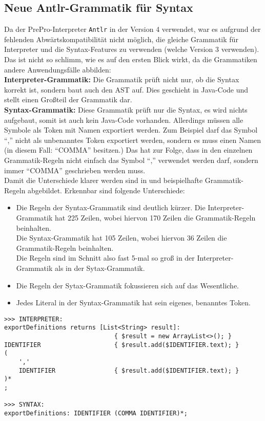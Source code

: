 \subsection{Neue Antlr-Grammatik für Syntax}
Da der PrePro-Interpreter \texttt{Antlr} in der Version 4 verwendet, war es aufgrund der fehlenden Abwärtskompatibilität nicht möglich, die gleiche Grammatik für Interpreter und die Syntax-Features zu verwenden (welche Version 3 verwenden).\\
Das ist nicht so schlimm, wie es auf den ersten Blick wirkt, da die Grammatiken andere Anwendungsfälle abbilden:\\
\textbf{Interpreter-Grammatik:} Die Grammatik prüft nicht nur, ob die Syntax korrekt ist, sondern baut auch den \ac{AST} auf.
Dies geschieht in Java-Code und stellt einen Großteil der Grammatik dar.\\
\textbf{Syntax-Grammatik:} Diese Grammatik prüft nur die Syntax, es wird nichts aufgebaut, somit ist auch kein Java-Code vorhanden.
Allerdings müssen alle Symbole als Token mit Namen exportiert werden.
Zum Beispiel darf das Symbol ``,'' nicht als unbenanntes Token exportiert werden, sondern es muss einen Namen (in diesem Fall: ``COMMA'' besitzen.)
Das hat zur Folge, dass in den einzelnen Grammatik-Regeln nicht einfach das Symbol ``,'' verwendet werden darf, sondern immer ``COMMA'' geschrieben werden muss.\\
Damit die Unterschiede klarer werden sind in  und  beispielhafte Grammatik-Regeln abgebildet.
Erkennbar sind folgende Unterschiede:
\begin{itemize}
\item Die Regeln der Syntax-Grammatik sind deutlich kürzer.
Die Interpreter-Grammatik hat 225 Zeilen, wobei hiervon 170 Zeilen die Grammatik-Regeln beinhalten.\\
Die Syntax-Grammatik hat 105 Zeilen, wobei hiervon 36 Zeilen die Grammatik-Regeln beinhalten.\\
Die Regeln sind im Schnitt also fast 5-mal so groß in der Interpreter-Grammatik als in der Sytax-Grammatik.
\item Die Regeln der Sytax-Grammatik fokussieren sich auf das Wesentliche.
\item Jedes Literal in der Syntax-Grammatik hat sein eigenes, benanntes Token.
\end{itemize}

\begin{lstlisting}[label={lst:diffInterpreterSyntax1}, caption={Grammatik-Regel ``exportDefinitions'' Interpreter vs Syntax}, captionpos=b]
>>> INTERPRETER:
exportDefinitions returns [List<String> result]:
                              { $result = new ArrayList<>(); }
IDENTIFIER                    { $result.add($IDENTIFIER.text); }
(
    ','
    IDENTIFIER                { $result.add($IDENTIFIER.text); }
)*
;

>>> SYNTAX:
exportDefinitions: IDENTIFIER (COMMA IDENTIFIER)*;
\end{lstlisting}

